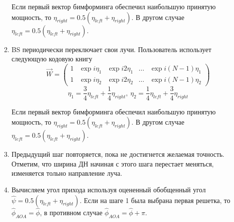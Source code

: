 \begin{enumerate}[label=\textbf{Шаг \arabic*:}]
          Если первый вектор бимформинга обеспечил наибольшую принятую мощность, то
          $\eta_{right} = 0.5 (\eta_{left} + \eta_{right})$.
          В другом случае
          $\eta_{left} = 0.5 (\eta_{left} + \eta_{right})$.
    \item BS периодически переключает свои лучи. Пользователь использует следующую кодовую книгу
          \begin{equation}
            \label{eq:4.55}
              \vec W =
              \begin{pmatrix}
                  1 & \exp{i\eta_1} & \exp{i2\eta_1} & \dots & \exp{i(N-1)\eta_1} \\
                  1 & \exp{i\eta_2} & \exp{i2\eta_2} & \dots & \exp{i(N-1)\eta_2}
              \end{pmatrix}
          \end{equation}
          \begin{equation}
              \eta_1 = \frac34 \eta_{left} + \frac14 \eta_{right}, ~ \eta_2 = \frac14 \eta_{left} + \frac34 \eta_{right}
          \end{equation}
          
          Если первый вектор бимформинга обеспечил наибольшую принятую мощность, то
          $\eta_{right} = 0.5 (\eta_{left} + \eta_{right})$.
          В другом случае
          $\eta_{left} = 0.5 (\eta_{left} + \eta_{right})$.
    \item Предыдущий шаг повторяется, пока не достигнется желаемая точность. Отметим, что ширина ДН начиная с этого шага перестает меняться, изменяется тольно направление луча.
    \item Вычисляем угол прихода используя оцененный обобщенный угол $\hat \psi = 0.5 (\eta_{left} + \eta_{right})$. Если на шаге 1 была выбрана первая решетка, то
          $\hat \phi_{AOA} = \hat \phi$, в противном случае $\hat \phi_{AOA} = \hat \phi + \pi$.
\end{enumerate}
